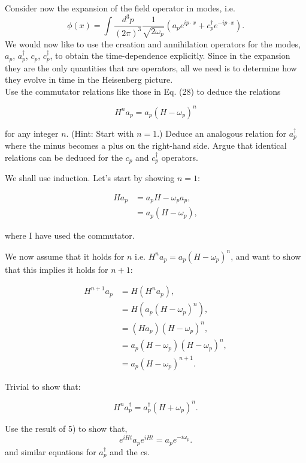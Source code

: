 \documentclass[working, oneside]{../../Preambles/tuftebook}
\begin{document}
\begin{exercise}[3.5]
Consider now the expansion of the field operator in modes, i.e.
$$\phi(x) = \int \frac{d^3p}{(2\pi)^3}\frac{1}{\sqrt{2\omega_p}}(a_pe^{ip\cdot x} + c_p^\dagger e^{-ip\cdot x}).$$
We would now like to use the creation and annihilation operators for the modes, $a_p$, $a_p^\dagger$, $c_p$, $c_p^\dagger$, to obtain the time-dependence explicitly. Since in the expansion they are the only quantities that are operators, all we need is to determine how they evolve in time in the Heisenberg picture. \\
Use the commutator relations like those in Eq. (28) to deduce the relations

$$H^na_p = a_p(H - \omega_p)^n$$

for any integer $n$. (Hint: Start with $n = 1$.) Deduce an analogous relation for $a_p^\dagger$ where the minus becomes a plus on the right-hand side. Argue that identical relations can be deduced for the $c_p$ and $c_p^\dagger$ operators.
\end{exercise}
\begin{solution}

We shall use induction. Let’s start by showing \( n = 1 \):

\begin{align*}
H a_p &= a_p H - \omega_p a_p, \\
&= a_p (H - \omega_p),
\end{align*}

where I have used the commutator.

We now assume that it holds for \( n \) i.e. $H^na_p = a_p \left( H - \omega_p \right)^{n} $, and want to show that this implies it holds for \( n+1 \):

\begin{align*}
H^{n+1} a_p &= H \left( H^n a_p \right), \\
&= H \left( a_p (H - \omega_p)^n \right), \\
&= \left( H a_p \right) (H - \omega_p)^n, \\
&= a_p (H - \omega_p) (H - \omega_p)^n, \\
&= a_p (H - \omega_p)^{n+1}.
\end{align*}

Trivial to show that:

\[
H^n a_p^\dagger = a_p^\dagger (H + \omega_p)^n.
\]
\end{solution}
\begin{exercise}[3.6]
Use the result of 5) to show that,
\[
e^{iHt}a_{p}e^{iHt}=a_{p}e^{-i\omega_p}
.\] 
and similar equations for $a_{p}^\dagger$ and the $c$s.
\end{exercise}
\end{document}

